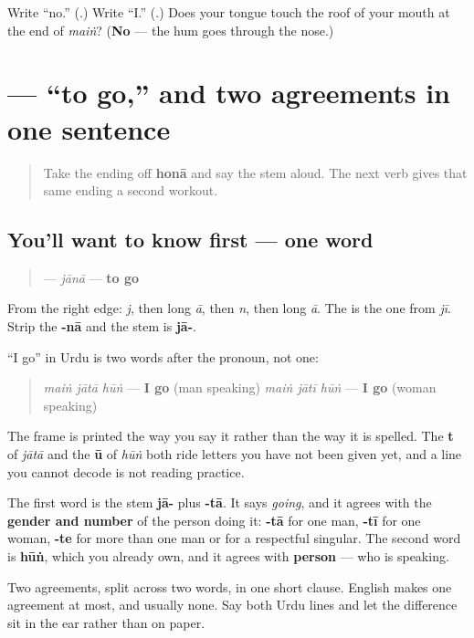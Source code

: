 \begin{tcolorbox}[breakable,colback=teal!4,colframe=teal!35!black,title={Before you move on}]
Write \textquotedblleft{}no.\textquotedblright{} (\textbf{}.) Write \textquotedblleft{}I.\textquotedblright{} (\textbf{}.) Does your tongue touch the roof of your mouth at the end of \emph{maiṅ}? (\textbf{No} — the hum goes through the nose.)
\end{tcolorbox}
\section[\texorpdfstring{\ur{جانا} (jānā)}{جانا (jānā)}]{ — “to go,” and two agreements in one sentence}

\label{lesson:UR-C06-jana}



\begin{quote}
Take the ending off \textbf{honā} and say the stem aloud. The next verb gives that same ending a second workout.
\end{quote}

\subsection*{You'll want to know first — one word}
\begin{quote}
\textbf{} — \emph{jānā} — \textbf{to go}
\end{quote}

From the right edge: \textbf{} \emph{j}, then \textbf{} long \emph{ā}, then \textbf{} \emph{n}, then \textbf{} long \emph{ā}. The \textbf{} is the one from \textbf{} \emph{jī}. Strip the \textbf{-nā} and the stem is \textbf{jā-}.

\begin{grammarlens}[title={Grammar Lens: the present tense agrees twice}]
“I go” in Urdu is two words after the pronoun, not one:

\begin{quote}
\emph{maiṅ jātā hūṅ} — \textbf{I go} (man speaking) \emph{maiṅ jātī hūṅ} — \textbf{I go} (woman speaking)
\end{quote}

The frame is printed the way you say it rather than the way it is spelled. The \textbf{t} of \emph{jātā} and the \textbf{ū} of \emph{hūṅ} both ride letters you have not been given yet, and a line you cannot decode is not reading practice.

The first word is the stem \textbf{jā-} plus \textbf{-tā}. It says \emph{going}, and it agrees with the \textbf{gender and number} of the person doing it: \textbf{-tā} for one man, \textbf{-tī} for one woman, \textbf{-te} for more than one man or for a respectful singular. The second word is \textbf{hūṅ}, which you already own, and it agrees with \textbf{person} — who is speaking.

Two agreements, split across two words, in one short clause. English makes one agreement at most, and usually none. Say both Urdu lines and let the difference sit in the ear rather than on paper.
\end{grammarlens}

